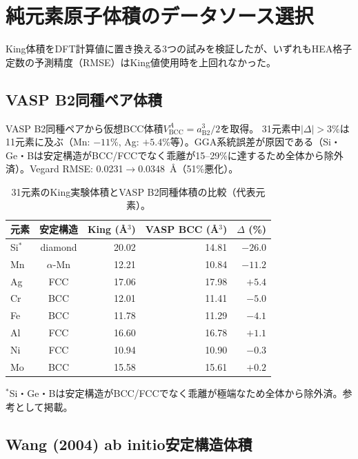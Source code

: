 \documentclass[5p,10pt]{elsarticle}
\begin{document}
\section{純元素原子体積のデータソース選択}
\label{sec:appendix_volumes}

King体積をDFT計算値に置き換える3つの試みを検証したが、いずれもHEA格子定数の予測精度（RMSE）はKing値使用時を上回れなかった。

\subsection{VASP B2同種ペア体積}
\label{sec:appendix_vasp_homo}

VASP B2同種ペアから仮想BCC体積$V^A_\text{BCC} = a^3_\text{B2}/2$を取得。
31元素中$|\Delta| > 3$\%は11元素に及ぶ（Mn: $-11$\%, Ag: $+5.4$\%等）。GGA系統誤差が原因である（Si・Ge・Bは安定構造がBCC/FCCでなく乖離が15--29\%に達するため全体から除外済）。Vegard RMSE: 0.0231$\to$0.0348~\AA{}（51\%悪化）。

\begin{table}[H]
\centering
\caption{31元素のKing実験体積とVASP B2同種体積の比較（代表元素）。}
\label{tab:king_vs_vasp_bcc}
\footnotesize
\begin{tabular}{@{}lcrrr@{}}
\toprule
元素 & 安定構造 & King (\AA$^3$) & VASP BCC (\AA$^3$) & $\Delta$ (\%) \\
\midrule
Si$^*$  & diamond    & 20.02 & 14.81 & $\mathbf{-26.0}$ \\
Mn      & $\alpha$-Mn & 12.21 & 10.84 & $\mathbf{-11.2}$ \\
Ag      & FCC        & 17.06 & 17.98 & $\mathbf{+5.4}$ \\
Cr      & BCC        & 12.01 & 11.41 & $\mathbf{-5.0}$ \\
Fe      & BCC        & 11.78 & 11.29 & $\mathbf{-4.1}$ \\
Al      & FCC        & 16.60 & 16.78 & $+1.1$ \\
Ni      & FCC        & 10.94 & 10.90 & $-0.3$ \\
Mo      & BCC        & 15.58 & 15.61 & $+0.2$ \\
\bottomrule
\end{tabular}
\par\smallskip
{\scriptsize $^*$Si・Ge・Bは安定構造がBCC/FCCでなく乖離が極端なため全体から除外済。参考として掲載。}
\end{table}

\subsection{Wang (2004) ab initio安定構造体積}
\label{sec:appendix_wang}
\end{document}

